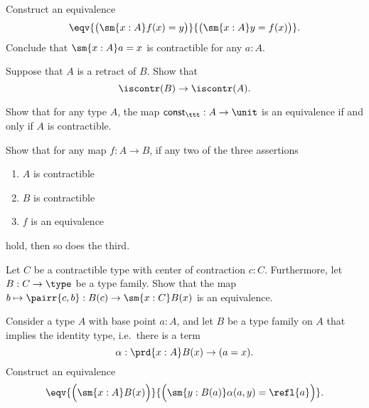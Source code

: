 \begin{exercises}
\item Construct an equivalence 
\begin{equation*}
\eqv{\big(\sm{x:A}f(x)=y\big)}{\big(\sm{x:A}y=f(x)\big)}.
\end{equation*}
Conclude that $\sm{x:A}a=x$ is contractible for any $a:A$.
\item \label{ex:contr_retr}Suppose that $A$ is a retract of $B$. Show that
\begin{equation*}
\iscontr(B)\to\iscontr(A).
\end{equation*}
\item \label{ex:contr_equiv}
\begin{subexenum}
\item Show that for any type $A$, the map $\mathsf{const}_\ttt : A\to \unit$ is an equivalence if and only if $A$ is contractible. 
\item Show that for any map $f:A\to B$, if any two of the three assertions
\begin{enumerate}
\item $A$ is contractible
\item $B$ is contractible
\item $f$ is an equivalence
\end{enumerate}
hold, then so does the third.
\end{subexenum}
\item \label{ex:contr_ind} Let $C$ be a contractible type with center of contraction $c:C$. Furthermore, let $B:C\to\type$ be a type family. Show that the map $b\mapsto\pairr{c,b}:B(c)\to\sm{x:C}B(x)$ is an equivalence.
\item \label{ex:coh_intro}Consider a type $A$ with base point $a:A$, and let $B$ be a type family on $A$ that implies the identity type, i.e.~there is a term
\begin{equation*}
\alpha : \prd{x:A} B(x)\to (a=x).
\end{equation*}
Construct an equivalence
\begin{equation*}
\eqv{\Big(\sm{x:A}B(x)\Big)}{\Big(\sm{y:B(a)}\alpha(a,y)=\refl{a}\Big)}.
\end{equation*}
\end{exercises}
